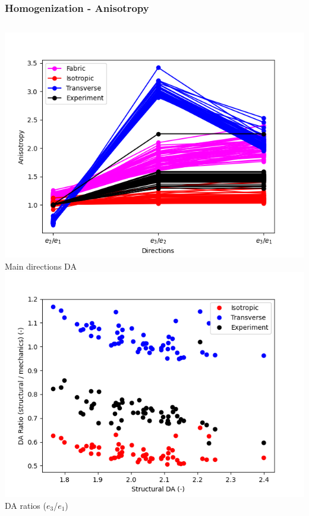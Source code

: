 \documentclass[xcolor=table,11pt]{beamer}
\begin{document}
	\begin{frame}
		\frametitle{Homogenization - Anisotropy}
		\vfill
		\begin{columns}
			\centering
			\includegraphics[width=\linewidth]{05_Homogenization/Plots/Anisotropy}\\
			Main directions DA
			\centering
			\includegraphics[width=\linewidth]{05_Homogenization/Plots/AnisotropyRatios}\\
			DA ratios ($e_3$/$e_1$)
		\end{columns}
		\vfill
	\end{frame}
\end{document}
